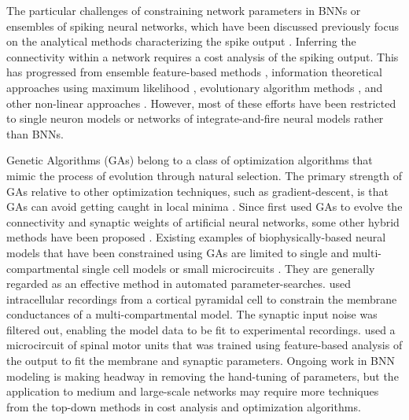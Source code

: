 \medskip{} 

The particular challenges of constraining network parameters in BNNs
or ensembles of spiking neural networks, which have been discussed
previously \citep{EggertHemmen:2001,Brette:2007} focus on the
analytical methods characterizing the spike output
\citep{Victor:2005,KostalLanskyEtAl:2007,BrownKassEtAl:2004}. Inferring
the connectivity within a network requires a cost analysis of the
spiking output.  This has progressed from ensemble feature-based
methods
\citep{SameshimaBaccala:1999,DahlhausEichlerEtAl:1997,TheunissenSenEtAl:2000},
information theoretical approaches using maximum likelihood
\citep{YamadaMatsumotoEtAl:1996,Chichilnisky:2001,OkatanWilsonEtAl:2005,PaninskiPillowEtAl:2004},
evolutionary algorithm methods \citep{TakahamaSakai:2005,Yao:1999},
and other non-linear approaches \citep{Eblen-ZajjurSalasEtAl:1999}.
However, most of these efforts have been restricted to single neuron
models or networks of integrate-and-fire neural models rather than
BNNs.

\medskip{} 

Genetic Algorithms (GAs) belong to a class of optimization algorithms
that mimic the process of evolution through natural selection. The
primary strength of GAs relative to other optimization techniques,
such as gradient-descent, is that GAs can avoid getting caught in
local minima \citep{Goldberg:1989,Whitley:1995}. Since
\citet{Holland:1975} first used GAs to evolve the connectivity and
synaptic weights of artificial neural networks, some other hybrid
methods have been proposed \citep{Yao:1999,Whitley:1995}. Existing
examples of biophysically-based neural models that have been
constrained using GAs are limited to single and multi-compartmental
single cell models
\citep{KerenPeledEtAl:2005,VanierBower:1999,VanDeEtAl:2008} or small
microcircuits \citep{TaylorEnoka:2004}.  They are generally regarded
as an effective method in automated
parameter-searches. \citet{KerenPeledEtAl:2005} used intracellular
recordings from a cortical pyramidal cell to constrain the membrane
conductances of a multi-compartmental model.  The synaptic input noise
was filtered out, enabling the model data to be fit to experimental
recordings. \citet{TaylorEnoka:2004} used a microcircuit of spinal
motor units that was trained using feature-based analysis of the
output to fit the membrane and synaptic parameters.  Ongoing work in
BNN modeling \citep{VanierBower:1999,VanDeEtAl:2008} is making headway
in removing the hand-tuning of parameters, but the application to
medium and large-scale networks may require more techniques from the
top-down methods in cost analysis and optimization algorithms.

